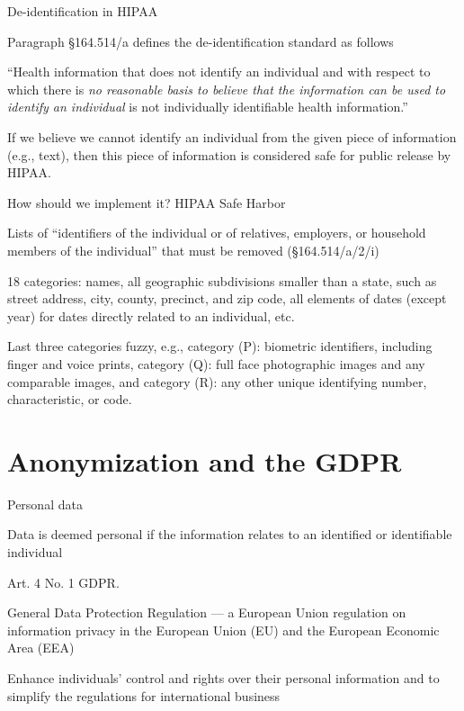 \documentclass[12pt,aspectratio=169,handout]{beamer}
\begin{document}
\begin{frame}{De-identification in HIPAA}


Paragraph \S 164.514/a defines the de-identification standard as follows

``Health information that does not identify an individual and with respect to which there is \emph{no reasonable basis to believe that the information can be used to identify an individual} is not individually identifiable health information.''

If we believe we cannot identify an individual from the given piece of information (e.g., text), then this piece of information is considered safe for public release by HIPAA.

\end{frame}

\begin{frame}{How should we implement it? HIPAA Safe Harbor}

Lists of ``identifiers of the individual or of relatives, employers, or household members of the individual'' that must be removed (\S 164.514/a/2/i)

18 categories: names, all geographic subdivisions smaller than a state, such as street address, city, county, precinct, and zip code, all elements of dates (except year) for dates directly related to an individual, etc.

\begin{footnotesize}
Last three categories fuzzy, e.g., category (P): biometric identifiers, including finger and voice prints, category (Q): full face photographic images and any comparable images, and category (R): any other unique identifying number, characteristic, or code.
\end{footnotesize}

\end{frame}




\section{Anonymization and the GDPR}

\begin{frame}{Personal data}

Data is deemed personal if the information relates to an identified or identifiable individual

Art. 4 No. 1 GDPR.


General Data Protection Regulation --- a European Union regulation on information privacy in the European Union (EU) and the European Economic Area (EEA)

Enhance individuals' control and rights over their personal information and to simplify the regulations for international business

\end{frame}
\end{document}
